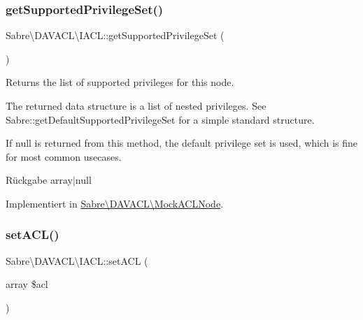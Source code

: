 \mbox{\label{interface_sabre_1_1_d_a_v_a_c_l_1_1_i_a_c_l_a9db850218d4002ed21bbd87665e0c614}} 
\subsubsection{\texorpdfstring{get\+Supported\+Privilege\+Set()}{getSupportedPrivilegeSet()}}
{\footnotesize\ttfamily Sabre\textbackslash{}\+D\+A\+V\+A\+C\+L\textbackslash{}\+I\+A\+C\+L\+::get\+Supported\+Privilege\+Set (\begin{DoxyParamCaption}{ }\end{DoxyParamCaption})}

Returns the list of supported privileges for this node.

The returned data structure is a list of nested privileges. See Sabre\+::get\+Default\+Supported\+Privilege\+Set for a simple standard structure.

If null is returned from this method, the default privilege set is used, which is fine for most common usecases.

\begin{DoxyReturn}{Rückgabe}
array$\vert$null 
\end{DoxyReturn}


Implementiert in \mbox{\hyperlink{class_sabre_1_1_d_a_v_a_c_l_1_1_mock_a_c_l_node_a9fe13e6c41773c26427f9b1ab46b3c8f}{Sabre\textbackslash{}\+D\+A\+V\+A\+C\+L\textbackslash{}\+Mock\+A\+C\+L\+Node}}.

\mbox{\label{interface_sabre_1_1_d_a_v_a_c_l_1_1_i_a_c_l_a95e96725db02aae734ce5e7fbb438174}} 
\subsubsection{\texorpdfstring{set\+A\+C\+L()}{setACL()}}
{\footnotesize\ttfamily Sabre\textbackslash{}\+D\+A\+V\+A\+C\+L\textbackslash{}\+I\+A\+C\+L\+::set\+A\+CL (\begin{DoxyParamCaption}\item[{array}]{\$acl }\end{DoxyParamCaption})}


